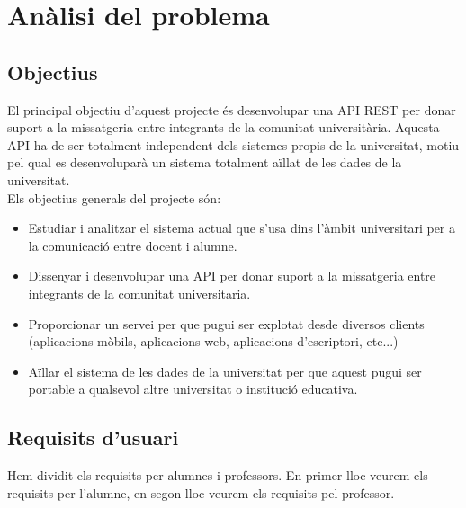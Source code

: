 
\chapter{Anàlisi del problema}\label{analisi}

\section{Objectius}
El principal objectiu d'aquest projecte és desenvolupar una \ac{API} \ac{REST} per donar suport a la missatgeria entre integrants de la comunitat universitària. Aquesta \ac{API} ha de ser totalment independent dels sistemes propis de la universitat, motiu pel qual es desenvoluparà un sistema totalment aïllat de les dades de la universitat. \\

Els objectius generals del projecte són:
\begin{itemize}
	\item Estudiar i analitzar el sistema actual que s'usa dins l'àmbit universitari per a la comunicació entre docent i alumne.
	\item Dissenyar i desenvolupar una \ac{API} per donar suport a la missatgeria entre integrants de la comunitat universitaria.
	\item Proporcionar un servei per que pugui ser explotat desde diversos clients (aplicacions mòbils, aplicacions web, aplicacions d'escriptori, etc...)
	\item Aïllar el sistema de les dades de la universitat per que aquest pugui ser portable a qualsevol altre universitat o institució educativa.
\end{itemize}
\section{Requisits d'usuari}
Hem dividit els requisits per alumnes i professors. En primer lloc veurem els requisits per l'alumne, en segon lloc veurem els requisits pel professor.
